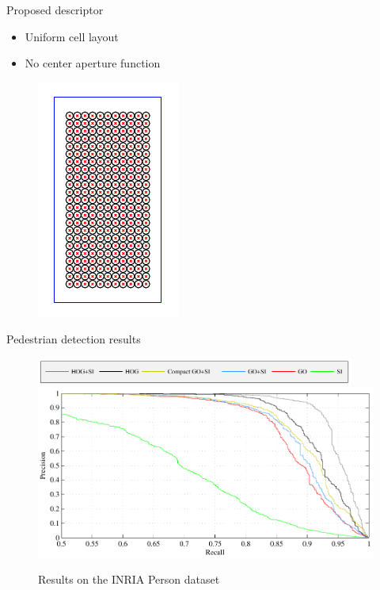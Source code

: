 \documentclass[14pt,t]{beamer}
\begin{document}
\begin{frame}{Proposed descriptor}
\begin{minipage}[t]{0.49\textwidth}
\begin{itemize}
\item Uniform cell layout
\item No center aperture function
\end{itemize}
\end{minipage}
\begin{minipage}[t]{0.49\textwidth}
\begin{figure}
	\includegraphics[height=0.7\textheight, clip=true, trim=9 9 9 9]{img/pedestrianWindowGrid.pdf}
\end{figure}
\end{minipage}
\end{frame}
%
\begin{frame}{Pedestrian detection results}
\begin{figure}[tb]
\centering
	\hspace{0.54cm}\includegraphics[width=0.935\textwidth]{../report/img/inriaTestResultsLegend.pdf} \\
	\includegraphics[width=\textwidth]{../report/img/inriaTestResultsPR.pdf}
	\caption{Results on the INRIA Person dataset}
	\label{fig:inriaTestResults}
\end{figure}
\end{frame}
\end{document}
